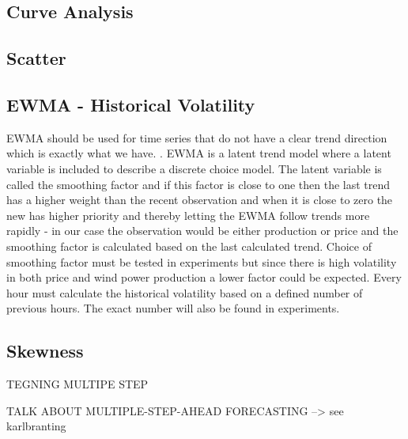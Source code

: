 \subsection{Curve Analysis}
\label{sec:curveAnalysis}

\subsection{Scatter}

\subsection{EWMA - Historical Volatility}
\label{sec:ewmaVolatility}

EWMA should be used for time series that do not have a clear trend direction\cite[Chapter~7.3.2]{econometrics} which is exactly what we have. . EWMA is a latent trend model where a latent variable is included to describe a discrete choice model. The latent variable is called the smoothing factor and if this factor is close to one then the last trend has a higher weight than the recent observation and when it is close to zero the new has higher priority and thereby letting the EWMA follow trends more rapidly - in our case the observation would be either production or price and the smoothing factor is calculated based on the last calculated trend. Choice of smoothing factor must be tested in experiments but since there is high volatility in both price and wind power production a lower factor could be expected. Every hour must calculate the historical volatility based on a defined number of previous hours. The exact number will also be found in experiments.

\subsection{Skewness}
\label{sec:skewness}




TEGNING MULTIPE STEP

TALK ABOUT MULTIPLE-STEP-AHEAD FORECASTING --> see karlbranting
